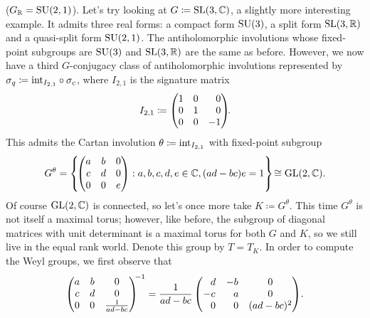 \noindent\begin{example}\textup{($G_\mathbb{R} = \textup{SU}(2,1)$).} Let's try looking at $G \coloneqq \textup{SL}(3, \mathbb{C})$, a slightly more interesting example. It admits three real forms: a compact form $\textup{SU}(3)$, a split form $\textup{SL}(3, \mathbb{R})$ and a quasi-split form $\textup{SU}(2, 1)$. The antiholomorphic involutions whose fixed-point subgroups are $\textup{SU}(3)$ and $\textup{SL}(3, \mathbb{R})$ are the same as before. However, we now have a third $G$-conjugacy class of antiholomorphic involutions represented by $\sigma_q \coloneqq \textup{int}_{I_{2,1}} \circ \sigma_c$, where $I_{2,1}$ is the signature matrix
\begin{align*}
\begin{split}
I_{2,1} \coloneqq \begin{pmatrix}1&0&\hphantom{-}0\\0&1&\hphantom{-}0\\0&0&-1\end{pmatrix}\!\!.
\end{split}
\end{align*}
\noindent This admits the Cartan involution $\theta \coloneqq \textup{int}_{I_{2,1}}$ with fixed-point subgroup
\begin{align*}
\begin{split}
G^\theta = \left\{\!\begin{pmatrix}a&b&0\\c&d&0\\0&0&e\end{pmatrix} : a, b, c, d, e \in \mathbb{C}, (ad - bc)e = 1\right\}\! \cong \textup{GL}(2, \mathbb{C}).
\end{split}
\end{align*}
\noindent Of course $\textup{GL}(2, \mathbb{C})$ is connected, so let's once more take $K \coloneqq G^\theta$. This time $G^\theta$ is not itself a maximal torus; however, like before, the subgroup of diagonal matrices with unit determinant is a maximal torus for both $G$ and $K$, so we still live in the equal rank world. Denote this group by $T = T_K$. In order to compute the Weyl groups, we first observe that
\begin{align*}
\begin{split}
\begin{pmatrix}a&b&0\\c&d&0\\0&0&\frac{1}{ad-bc}\end{pmatrix}^{\!\!-1} = \frac{1}{ad-bc}\begin{pmatrix}\hphantom{-}d&-b&0\\-c&\hphantom{-}a&0\\\hphantom{-}0&\hphantom{-}0&(ad-bc)^2\end{pmatrix}\!.

\end{split}
\end{align*}
\end{example}
